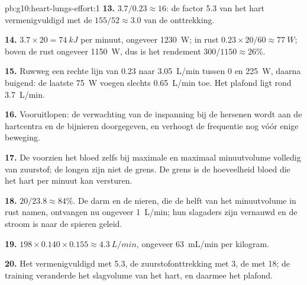 \begin{solution}{pb:g10:heart-lungs-effort:1}
\textbf{13.} $3.7/0.23 \approx 16$: de factor 5.3 van het hart
vermenigvuldigd met de $155/52 \approx 3.0$ van de onttrekking.

\textbf{14.} $3.7 \times 20 = \qty{74}{kJ}$ per minuut, ongeveer
\qty{1230}{W}; in rust $0.23 \times 20/60 \approx \qty{77}{W}$; boven de
rust ongeveer \qty{1150}{W}, dus is het rendement $300/1150 \approx
26\%$.

\textbf{15.} Ruwweg een rechte lijn van \num{0.23} naar
\qty{3.05}{L/min} tussen 0 en \qty{225}{W}, daarna buigend: de laatste
\qty{75}{W} voegen slechts \qty{0.65}{L/min} toe. Het plafond ligt rond
\qty{3.7}{L/min}.

\textbf{16.} Vooruitlopen: de verwachting van de inspanning bij de
hersenen wordt aan de hartcentra en de bijnieren doorgegeven, en verhoogt
de frequentie nog vóór enige beweging.

\textbf{17.} De  voorzien het bloed zelfs bij maximale
 en maximaal minuutvolume volledig van zuurstof; de longen zijn
niet de grens. De grens is de hoeveelheid bloed die het hart per minuut
kan versturen.

\textbf{18.} $20/23.8 \approx 84\%$. De darm en de nieren, die de helft
van het minuutvolume in rust namen, ontvangen nu ongeveer \qty{1}{L/min};
hun slagaders zijn vernauwd en de stroom is naar de spieren geleid.

\textbf{19.} $198 \times 0.140 \times 0.155 \approx \qty{4.3}{L/min}$,
ongeveer \qty{63}{mL/min} per kilogram.

\textbf{20.} Het  vermenigvuldigd met 5.3, de
zuurstofonttrekking met 3, de  met 18; de training veranderde
het slagvolume van het hart, en daarmee het plafond.
\end{solution}

